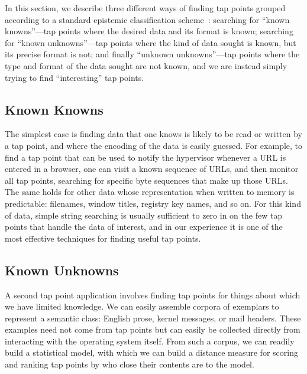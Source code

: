 In this section, we describe three different ways of finding tap points
grouped according to a standard epistemic classification
scheme~\cite{Rumsfeld:2002}: searching for ``known knowns''---tap points
where the desired data and its format is known; searching for ``known
unknowns''---tap points where the kind of data sought is known, but its
precise format is not; and finally ``unknown unknowns''---tap points
where the type and format of the data sought are not known, and we are
instead simply trying to find ``interesting'' tap points.

\subsection{Known Knowns}

The simplest case is finding data that one knows is likely to be read or
written by a tap point, and where the encoding of the data is easily
guessed. For example, to find a tap point that can be used to notify
the hypervisor whenever a URL is entered in a browser, one can visit a
known sequence of URLs, and then monitor all tap points, searching for
specific byte sequences that make up those URLs. The same holds for
other data whose representation when written to memory is predictable:
filenames, window titles, registry key names, and so on. For this kind
of data, simple string searching is usually sufficient to zero in on the
few tap points that handle the data of interest, and in our experience
it is one of the most effective techniques for finding useful tap
points.

\subsection{Known Unknowns}
\label{sec:technical:subsec:knownunk}

A second tap point application involves finding tap points for things
about which we have limited knowledge.
We can easily assemble corpora of exemplars to represent a semantic
class: English prose, kernel messages, or mail headers. These examples
need not come from tap points but can easily be collected directly from
interacting with the operating system itself. From such a corpus, we can
readily build a statistical model, with which we can build a distance
measure for scoring and ranking tap points by who close their contents
are to the model.




